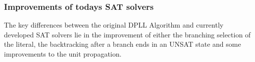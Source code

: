 \subsubsection{Improvements of todays SAT solvers}
The key differences between the original DPLL Algorithm and currently developed SAT solvers lie in the improvement of either the branching selection of the literal, the backtracking after a branch ends in an UNSAT state and some improvements to the unit propagation.
